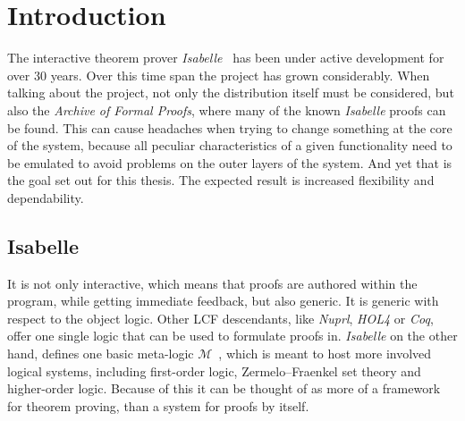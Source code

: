 
\chapter{Introduction}\label{chapter:introduction}

The interactive theorem prover \textit{Isabelle}~\parencite{Paulson1986} has been under active development for over 30 years. Over this time span the project has grown considerably. When talking about the project, not only the distribution itself must be considered, but also the \textit{Archive of Formal Proofs}, where many of the known \textit{Isabelle} proofs can be found. This can cause headaches when trying to change something at the core of the system, because all peculiar characteristics of a given functionality need to be emulated to avoid problems on the outer layers of the system. And yet that is the goal set out for this thesis. The expected result is increased flexibility and dependability.

\section{Isabelle}
It is not only interactive, which means that proofs are authored within the program, while getting immediate feedback, but also generic. It is generic with respect to the object logic. Other LCF descendants, like \textit{Nuprl}, \textit{HOL4} or \textit{Coq}, offer one single logic that can be used to formulate proofs in. \textit{Isabelle} on the other hand, defines one basic meta-logic $\mathcal{M}$~\parencite{Paulson1989}, which is meant to host more involved logical systems, including first-order logic, Zermelo–Fraenkel set theory and higher-order logic. Because of this it can be thought of as more of a framework for theorem proving, than a system for proofs by itself.

